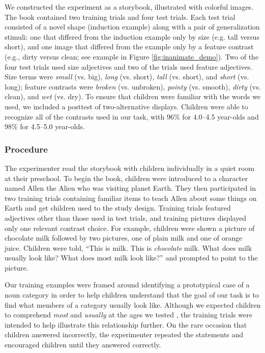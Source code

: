 \documentclass[man]{apa2}
\begin{document}
We constructed the experiment as a storybook, illustrated with colorful images. The book contained two training trials and four test trials. Each test trial consisted of a novel shape (induction example) along with a pair of generalization stimuli: one that differed from the induction example only by size (e.g. tall versus short), and one image that differed from the example only by a feature contrast (e.g., dirty versus clean; see example in Figure \ref{fig:inanimate_demo}). Two of the four test trials used size adjectives and two of the trials used feature adjectives. Size terms were \emph{small} (vs. big), \emph{long} (vs. short), \emph{tall} (vs. short), and \emph{short} (vs. long);  feature contrasts were \emph{broken} (vs. unbroken), \emph{pointy} (vs. smooth), \emph{dirty} (vs. clean), and \emph{wet} (vs. dry).  To ensure that children were familiar with the words we used, we included a posttest of two-alternative displays.  Children were able to recognize all of the contrasts used in our task, with 96\% for 4.0--4.5 year-olds and 98\% for 4.5--5.0 year-olds.  

\subsubsection{Procedure}

The experimenter read the storybook with children individually in a quiet room at their preschool. To begin the book, children were introduced to a character named Allen the Alien who was visiting planet Earth.  They then participated in two training trials containing familiar items to teach Allen about some things on Earth and get children used to the study design.  Training trials featured adjectives other than those used in test trials, and training pictures displayed only one relevant contrast choice.  For example, children were shown a picture of chocolate milk followed by two pictures, one of plain milk and one of orange juice. Children were told, ``This is milk. This is \emph{chocolate} milk.  What does milk usually look like?  What does most milk look like?'' and prompted to point to the picture. 

Our training examples were framed around identifying a prototypical case of a noun category in order to help children understand that the goal of our task is to find what members of a category usually look like. Although we expected children to comprehend \emph{most} and \emph{usually} at the ages we tested \cite{halberda2008}, the training trials were intended to  help illustrate this relationship further. On the rare occasion that children answered incorrectly, the experimenter repeated the statements and encouraged children until they answered correctly.  
\end{document}
